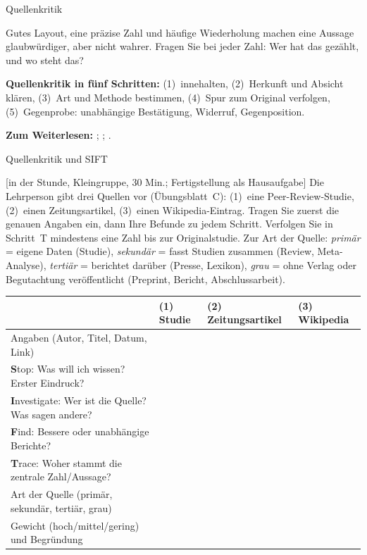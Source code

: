 \begin{handout}{Quellenkritik}
\begin{merkbox}
Gutes Layout, eine präzise Zahl und häufige Wiederholung machen eine
Aussage glaubwürdiger, aber nicht wahrer. Fragen Sie bei jeder Zahl: Wer
hat das gezählt, und wo steht das?
\end{merkbox}

\textbf{Quellenkritik in fünf Schritten:} (1)~innehalten, (2)~Herkunft
und Absicht klären, (3)~Art und Methode bestimmen, (4)~Spur zum Original
verfolgen, (5)~Gegenprobe: unabhängige Bestätigung, Widerruf,
Gegenposition.

\textbf{Zum Weiterlesen:} \textcite{wineburg2019lateral};
\textcite{caulfield2023verified}; \textcite{seglen1997impact}.
\end{handout}

\begin{uebungsblatt}{Quellenkritik und SIFT}

[in der Stunde, Kleingruppe, 30 Min.; Fertigstellung als Hausaufgabe]
Die Lehrperson gibt drei Quellen vor (Übungsblatt~C): (1)~eine
Peer-Review-Studie, (2)~einen Zeitungsartikel, (3)~einen Wikipedia-Eintrag. Tragen Sie
zuerst die genauen Angaben ein, dann Ihre Befunde zu jedem Schritt.
Verfolgen Sie in Schritt~T mindestens eine Zahl bis zur Originalstudie.
Zur Art der Quelle: \emph{primär} = eigene Daten (Studie),
\emph{sekundär} = fasst Studien zusammen (Review, Meta-Analyse),
\emph{tertiär} = berichtet darüber (Presse, Lexikon), \emph{grau} = ohne
Verlag oder Begutachtung veröffentlicht (Preprint, Bericht,
Abschlussarbeit).

\begin{center}
\small
\renewcommand{\arraystretch}{1.3}
\begin{tabular}{|>{\raggedright\arraybackslash}p{}|p{}|p{}|p{}|}
\hline
 & \textbf{(1) Studie} & \textbf{(2) Zeitungsartikel} & \textbf{(3) Wikipedia} \\
\hline
Angaben (Autor, Titel, Datum, Link) & \rule{0pt}{14mm} & & \\ \hline
\textbf{S}top: Was will ich wissen? Erster Eindruck? & \rule{0pt}{16mm} & & \\ \hline
\textbf{I}nvestigate: Wer ist die Quelle? Was sagen andere? & \rule{0pt}{18mm} & & \\ \hline
\textbf{F}ind: Bessere oder unabhängige Berichte? & \rule{0pt}{16mm} & & \\ \hline
\textbf{T}race: Woher stammt die zentrale Zahl/Aussage? & \rule{0pt}{18mm} & & \\ \hline
Art der Quelle (primär, sekundär, tertiär, grau) & \rule{0pt}{9mm} & & \\ \hline
Gewicht (hoch/mittel/gering) und Begründung & \rule{0pt}{16mm} & & \\ \hline
\end{tabular}
\end{center}
\end{uebungsblatt}

